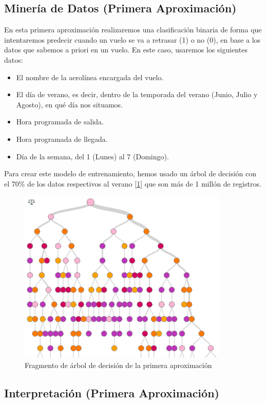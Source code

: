 \documentclass[format=acmsmall, review=false, screen=true]{acmart}
\begin{document}
\subsection{Minería de Datos (Primera Aproximación)}
En esta primera aproximación realizaremos una clasificación binaria de forma que intentaremos predecir cuando un vuelo se va a retrasar (1) o no (0), en base a los datos que sabemos a priori en un vuelo. En este caso, usaremos los siguientes datos:
\begin{itemize}
	\item El nombre de la aerolínea encargada del vuelo.
	\item El día de verano, es decir, dentro de la temporada del verano (Junio, Julio y Agosto), en qué día nos situamos.
	\item Hora programada de salida.
	\item Hora programada de llegada.
	\item Día de la semana, del 1 (Lunes) al 7 (Domingo).
\end{itemize}
Para crear este modelo de entrenamiento, hemos usado un árbol de decisión con el 70\% de los datos respectivos al verano [\ref{fig:ArbAprox1}] que son más de 1 millón de registros.

\begin{figure}[htb]
	\centering
	\includegraphics[width=10cm]{ArbAprox1.png}
	\caption{Fragmento de árbol de decisión de la primera aproximación}
	\label{fig:ArbAprox1}
\end{figure}


\subsection{Interpretación (Primera Aproximación)}
\end{document}
